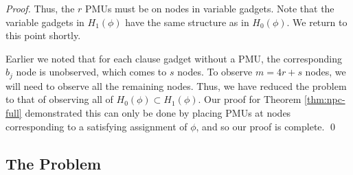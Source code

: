 \begin{proof}
Thus, the $r$ PMUs must be on nodes in variable gadgets. Note that the variable gadgets in $H_1(\phi)$ have the same structure as in $H_0(\phi)$. We return to this point shortly.

Earlier we noted that for each clause gadget without a PMU, the corresponding $b_j$ node is unobserved, which comes to $s$ nodes. To observe $m=4r+s$ nodes, we will need to observe all the remaining nodes. Thus, we have reduced the problem to that of observing all of $H_0(\phi)\subset H_1(\phi)$. Our proof for Theorem \ref{thm:npc-full} demonstrated this can only be done by placing PMUs at nodes corresponding to a satisfying assignment of $\phi$, and so our proof is complete. \qed
\end{proof}



\subsection{The \xval Problem}
\label{subsec:xval}


%

